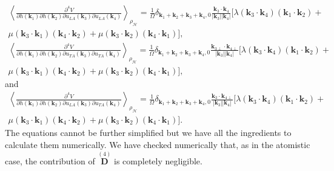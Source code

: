 \begin{multline}
	\left\langle\frac{\partial^{4}V}{\partial h(\boldsymbol{k}_{1})\partial h(\boldsymbol{k}_{2})\partial u_{LA}(\boldsymbol{k}_{3})\partial u_{LA}(\boldsymbol{k}_{4})}\right\rangle_{\rho_{\mathcal{H}}}=\frac{1}{\Omega}\delta_{\boldsymbol{
 k}_{1}+\boldsymbol{k}_{2}+\boldsymbol{k}_{3}+\boldsymbol{k}_{4},0}\frac{\boldsymbol{k}_{3}\cdot\boldsymbol{k}_{4}}{|\boldsymbol{k}_{3}||\boldsymbol{k}_{4}|}[\lambda(\boldsymbol{k}_{3}\cdot\boldsymbol{k}_{4})(\boldsymbol{k}_{
 1}\cdot\boldsymbol{k}_{2})+\\\mu(\boldsymbol{k}_{3}\cdot\boldsymbol{k}_{1})(\boldsymbol{k}_{4}\cdot\boldsymbol{k}_{2})+\mu(\boldsymbol{k}_{3}\cdot\boldsymbol{k}_{2})(\boldsymbol{k}_{4}\cdot\boldsymbol{k}_{1})],
\end{multline}
\begin{multline}
	\left\langle\frac{\partial^{4}V}{\partial h(\boldsymbol{k}_{1})\partial h(\boldsymbol{k}_{2})\partial u_{TA}(\boldsymbol{k}_{3})\partial u_{TA}(\boldsymbol{k}_{4})}\right\rangle_{\rho_{\mathcal{H}}}=\frac{1}{\Omega}\delta_{\boldsymbol{
 k}_{1}+\boldsymbol{k}_{2}+\boldsymbol{k}_{3}+\boldsymbol{k}_{4},0}\frac{\boldsymbol{k}_{3\perp}\cdot\boldsymbol{k}_{4\perp}}{|\boldsymbol{k}_{3}||\boldsymbol{k}_{4}|}[\lambda(\boldsymbol{k}_{3}\cdot\boldsymbol{k}_{4})(\boldsymbol{k}_{
 1}\cdot\boldsymbol{k}_{2})+\\\mu(\boldsymbol{k}_{3}\cdot\boldsymbol{k}_{1})(\boldsymbol{k}_{4}\cdot\boldsymbol{k}_{2})+\mu(\boldsymbol{k}_{3}\cdot\boldsymbol{k}_{2})(\boldsymbol{k}_{4}\cdot\boldsymbol{k}_{1})],
\end{multline}
and
\begin{multline}
	\left\langle\frac{\partial^{4}V}{\partial h(\boldsymbol{k}_{1})\partial h(\boldsymbol{k}_{2})\partial u_{LA}(\boldsymbol{k}_{3})\partial u_{TA}(\boldsymbol{k}_{4})}\right\rangle_{\rho_{\mathcal{H}}}=\frac{1}{\Omega}\delta_{\boldsymbol{
 k}_{1}+\boldsymbol{k}_{2}+\boldsymbol{k}_{3}+\boldsymbol{k}_{4},0}\frac{\boldsymbol{k}_{3}\cdot\boldsymbol{k}_{4\perp}}{|\boldsymbol{k}_{3}||\boldsymbol{k}_{4}|}[\lambda(\boldsymbol{k}_{3}\cdot\boldsymbol{k}_{4})(\boldsymbol{k}_{
 1}\cdot\boldsymbol{k}_{2})+\\\mu(\boldsymbol{k}_{3}\cdot\boldsymbol{k}_{1})(\boldsymbol{k}_{4}\cdot\boldsymbol{k}_{2})+\mu(\boldsymbol{k}_{3}\cdot\boldsymbol{k}_{2})(\boldsymbol{k}_{4}\cdot\boldsymbol{k}_{1})].
\end{multline}
The equations cannot be further simplified but we have all the ingredients to calculate them numerically. We have
checked numerically that, as in the atomistic case, the contribution of $\overset{(4)}{\boldsymbol{D}}$ is
completely negligible. \\

